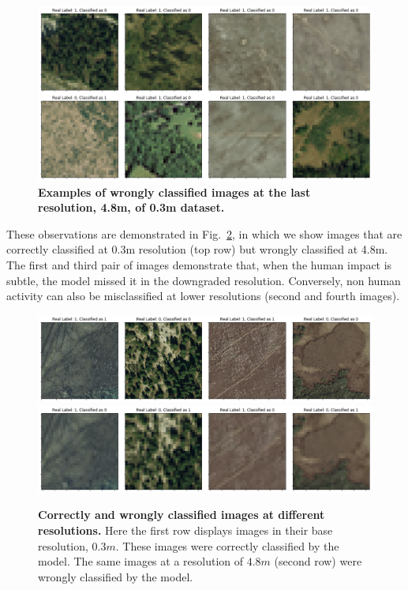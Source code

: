 \begin{figure}[H]
	\centering
	\captionsetup{width=1\linewidth}
	\includegraphics[width=1\textwidth]{Figures/results/class_dataset03m_res48_wrong.png}
	\caption{\textbf{Examples of wrongly classified images at the last resolution, 4.8m, of 0.3m dataset.}}
	\label{fig:dataset03m_res48_wrong}
\end{figure}

These observations are demonstrated in Fig.~\ref{fig:dataset03m_res03_res48_comp}, in which we show images that are correctly classified at 0.3m resolution (top row) but wrongly classified at 4.8m. The first and third pair of images demonstrate that, when the human impact is subtle, the model missed it in the downgraded resolution. Conversely, non human activity can also be misclassified at lower resolutions (second and fourth images).

\begin{figure}[H]
	\centering
	\captionsetup{width=1\linewidth}
	\includegraphics[width=1\textwidth]{Figures/results/class_dataset03m_res03_comp_correct.png}
	\includegraphics[width=1\textwidth]{Figures/results/class_dataset03m_res48_comp_wrong.png}
	\caption{\textbf{Correctly and wrongly classified images at different resolutions.} Here the first row displays images in their base resolution, $0.3m$. These images were correctly classified by the model. The same images at a resolution of $4.8m$ (second row) were wrongly classified by the model.}
	\label{fig:dataset03m_res03_res48_comp}
\end{figure}

